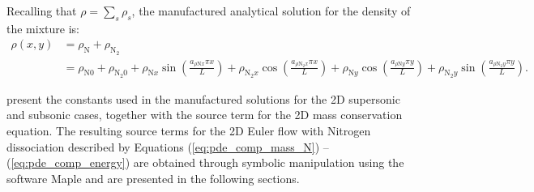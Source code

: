 \documentclass[10pt]{article}
\begin{document}
Recalling that $\rho=\sum_s \rho_s$, the manufactured analytical solution for the density of the mixture is:
\begin{equation}
\label{eq:manufactured03}
\begin{split}
\rho\left(x,y\right) &= \rho_{\text{N}}+\rho_{\text{N}_2}\\
                     &= \rho_{\text{N}0} + \rho_{\text{N}_2 0} +
\rho_{\text{N}x} \sin\left(\frac{a_{  \rho \text{N} x }\pi x}{L}\right) + \rho_{\text{N}_2 x} \cos\left(\frac{a_{ \rho \text{N}_2 x } \pi x}{L}\right) +
\rho_{\text{N} y} \cos\left(\frac{a_{  \rho \text{N} y} \pi y}{L}\right) + \rho_{\text{N}_2 y} \sin\left(\frac{a_{ \rho \text{N}_2 y } \pi y}{L}\right).
\end{split}
\end{equation}




\citet{Roy2002} present the constants used in the manufactured solutions for the 2D supersonic and subsonic cases, together with the source term for the 2D mass conservation equation. The resulting source terms for the 2D Euler flow with Nitrogen dissociation described by Equations (\ref{eq:pde_comp_mass_N}) -- (\ref{eq:pde_comp_energy}) are obtained through symbolic manipulation using the software Maple and are presented in the following sections.

\end{document}
